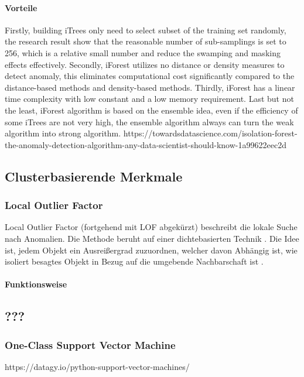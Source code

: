 \paragraph{Vorteile}
Firstly, building iTrees only need to select subset of the training set randomly, the research result show that the reasonable number of
sub-samplings is set to 256, which is a relative small number and reduce the swamping and masking effects effectively. Secondly, iForest utilizes no distance or density measures to detect anomaly, this eliminates computational cost significantly compared to the distance-based methods and density-based methods. Thirdly, iForest has a linear time complexity with low constant and a low memory
requirement. Last but not the least, iForest algorithm is based on the ensemble idea, even if the efficiency of some
iTrees are not very high, the ensemble algorithm always can turn the weak algorithm into strong algorithm.
https://towardsdatascience.com/isolation-forest-the-anomaly-detection-algorithm-any-data-scientist-should-know-1a99622eec2d
\newpage

\subsection{Clusterbasierende Merkmale}
\subsubsection{Local Outlier Factor}
Local Outlier Factor (fortgehend mit LOF abgekürzt) beschreibt die lokale Suche nach Anomalien. Die Methode beruht auf einer dichtebasierten Technik \cite{alghushairyReviewLocalOutlier2020}. Die Idee ist, jedem Objekt ein Ausreißergrad zuzuordnen, welcher davon Abhängig ist, wie isoliert besagtes Objekt in Bezug auf die umgebende Nachbarschaft ist \cite{breunigLOFIdentifyingDensitybased2000}. 
\paragraph{Funktionsweise}

\newpage

\subsection{???}
\subsubsection{One-Class Support Vector Machine}
https://datagy.io/python-support-vector-machines/
\newpage

